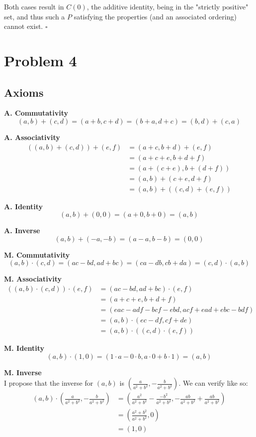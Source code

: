 \documentclass[12pt]{article}
\begin{document}
Both cases result in $C(0)$, the additive identity, being in the "strictly positive" set,
and thus such a $P$ satisfying the properties (and an associated ordering)
cannot exist. $\square$

\pagebreak

\section{Problem 4}

\subsection{Axioms}

\textbf{A. Commutativity}
\[(a,b)+(c,d)=(a+b,c+d)=(b+a,d+c)=(b,d)+(c,a)\]

\textbf{A. Associativity}
\begin{align*}
      ((a,b)+(c,d))+(e,f)
       & = (a+c,b+d)+(e,f)     \\
       & = (a+c+e,b+d+f)       \\
       & = (a+(c+e),b+(d+f))   \\
       & = (a,b)+(c+e,d+f)     \\
       & = (a,b)+((c,d)+(e,f))
\end{align*}

\textbf{A. Identity}
\[(a,b)+(0,0)=(a+0,b+0)=(a,b)\]

\textbf{A. Inverse}
\[(a,b)+(-a,-b)=(a-a,b-b)=(0,0)\]

\textbf{M. Commutativity}
\[(a,b)\cdot(c,d)=(ac-bd,ad+bc)=(ca-db,cb+da)=(c,d)\cdot(a,b)\]

\textbf{M. Associativity}
\begin{align*}
      ((a,b)\cdot(c,d))\cdot(e,f)
       & = (ac-bd,ad+bc)\cdot(e,f)           \\
       & = (a+c+e,b+d+f)                     \\
       & = (eac-adf-bcf-ebd,acf+ead+ebc-bdf) \\
       & = (a,b)\cdot(ec-df,cf+de)           \\
       & = (a,b)\cdot((c,d)\cdot(e,f))
\end{align*}

\textbf{M. Identity}
\[(a,b)\cdot(1,0)=(1 \cdot a - 0 \cdot b, a \cdot 0 + b \cdot 1)=(a,b)\]

\textbf{M. Inverse} \\
I propose that the inverse for $(a, b)$ is $\left(\frac{a}{a^2+b^2},-\frac{b}{a^2+b^2}\right)$.
We can verify like so:
\begin{align*}
      (a,b) \cdot \left(\frac{a}{a^2+b^2},-\frac{b}{a^2+b^2}\right)
       & = \left(\frac{a^2}{a^2+b^2}-\frac{-b^2}{a^2+b^2}, -\frac{ab}{a^2+b^2}+\frac{ab}{a^2+b^2}\right) \\
       & = \left(\frac{a^2+b^2}{a^2+b^2}, 0\right)                                                       \\
       & = (1, 0)
\end{align*}
\end{document}
